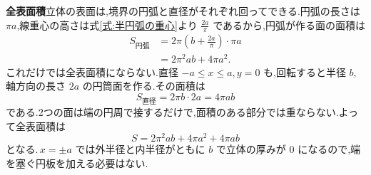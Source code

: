 \textbf{全表面積}\quad 立体の表面は,境界の円弧と直径がそれぞれ回ってできる.円弧の長さは $\pi a$,線重心の高さは式\eqref{式:半円弧の重心}より $\frac{2a}{\pi}$ であるから,円弧が作る面の面積は
\begin{align*}
S_{\mathrm{円弧}}
 &=2\pi\left(b+\frac{2a}{\pi}\right)\cdot\pi a\\
 &=2\pi^2ab+4\pi a^2.
\end{align*}
これだけでは全表面積にならない.直径 $-a\le x\le a$,\,$y=0$ も,回転すると半径 $b$,軸方向の長さ $2a$ の円筒面を作る.その面積は
\[
S_{\mathrm{直径}}=2\pi b\cdot2a=4\pi ab
\]
である.2つの面は端の円周で接するだけで,面積のある部分では重ならない.よって全表面積は
\[
S=2\pi^2ab+4\pi a^2+4\pi ab
\]
となる.\,$x=\pm a$ では外半径と内半径がともに $b$ で立体の厚みが $0$ になるので,端を塞ぐ円板を加える必要はない.
